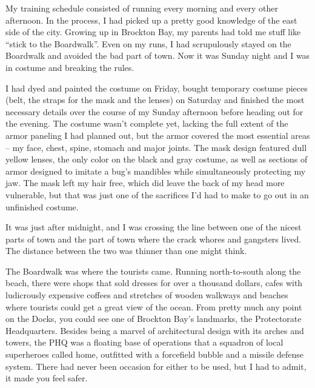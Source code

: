 





My training schedule consisted of running every morning and every other afternoon.  In the process, I had picked up a pretty good knowledge of the east side of the city.  Growing up in Brockton Bay, my parents had told me stuff like ``stick to the Boardwalk''.  Even on my runs, I had scrupulously stayed on the Boardwalk and avoided the bad part of town.  Now it was Sunday night and I was in costume and breaking the rules.



I had dyed and painted the costume on Friday, bought temporary costume pieces (belt, the straps for the mask and the lenses) on Saturday and finished the most necessary details over the course of my Sunday afternoon before heading out for the evening.  The costume wasn't complete yet, lacking the full extent of the armor paneling I had planned out, but the armor covered the most essential areas – my face, chest, spine, stomach and major joints.  The mask design featured dull yellow lenses, the only color on the black and gray costume, as well as sections of armor designed to imitate a bug's mandibles while simultaneously protecting my jaw.  The mask left my hair free, which did leave the back of my head more vulnerable, but that was just one of the sacrifices I'd had to make to go out in an unfinished costume.



It was just after midnight, and I was crossing the line between one of the nicest parts of town and the part of town where the crack whores and gangsters lived.  The distance between the two was thinner than one might think.



The Boardwalk was where the tourists came.  Running north-to-south along the beach, there were shops that sold dresses for over a thousand dollars, cafes with ludicrously expensive coffees and stretches of wooden walkways and beaches where tourists could get a great view of the ocean.  From pretty much any point on the Docks, you could see one of Brockton Bay's landmarks, the Protectorate Headquarters.  Besides being a marvel of architectural design with its arches and towers, the PHQ was a floating base of operations that a squadron of local superheroes called home, outfitted with a forcefield bubble and a missile defense system.  There had never been occasion for either to be used, but I had to admit, it made you feel safer.



